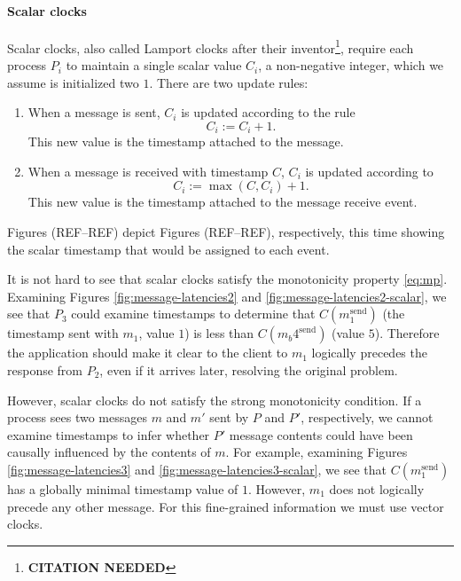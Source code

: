 \documentclass[]             %
{NASA}                       %
\theoremstyle{definition}
\newcommand{\citationneeded}{\footnote{\textbf{CITATION NEEDED}}}
\begin{document}
\paragraph{Scalar clocks}
Scalar clocks, also called Lamport clocks after their inventor\citationneeded,
require each process $P_i$ to maintain a single scalar value $C_i$, a
non-negative integer, which we assume is initialized two $1$. There
are two update rules:

\begin{enumerate}
\item When a message is sent, $C_i$ is updated according to the rule
  \[C_i := C_i + 1.\]
  This new value is the timestamp attached to the message.
\item When a message is received with timestamp $C$, $C_i$ is updated according to
  \[C_i := \max(C, C_i) + 1.\]
  This new value is the timestamp attached to the message receive event.
\end{enumerate}

Figures (REF--REF) depict Figures (REF--REF), respectively, this time
showing the scalar timestamp that would be assigned to each event.

It is not hard to see that scalar clocks satisfy the monotonicity
property \ref{eq:mp}. Examining Figures \ref{fig:message-latencies2}
and \ref{fig:message-latencies2-scalar}, we see that $P_3$ could
examine timestamps to determine that $C(m_1^\textrm{send})$ (the
timestamp sent with $m_1$, value $1$) is less than
$C(m_b4^\textrm{send})$ (value $5$). Therefore the application should
make it clear to the client to $m_1$ logically precedes the response
from $P_2$, even if it arrives later, resolving the original problem.

However, scalar clocks do not satisfy the strong monotonicity
condition. If a process sees two messages $m$ and $m'$ sent by $P$ and
$P'$, respectively, we cannot examine timestamps to infer whether $P'$
message contents could have been causally influenced by the contents
of $m$. For example, examining Figures \ref{fig:message-latencies3}
and \ref{fig:message-latencies3-scalar}, we see that
$C(m_1^\textrm{send})$ has a globally minimal timestamp value of
$1$. However, $m_1$ does not logically precede any other message. For
this fine-grained information we must use vector clocks.
\end{document}
